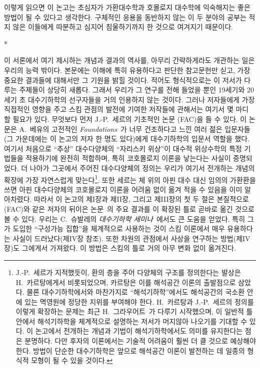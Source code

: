 이렇게 읽으면 이 논고는 초심자가 가환대수학과 호몰로지 대수학에 익숙해지는 좋은 방법이 될 수 있다고 생각한다. 구체적인 응용을 동반하지 않는 이 두 분야의 공부는 적지 않은 이들에게 따분하고 심지어 침울하기까지 한 것으로 여겨지기 때문이다.

\bigskip
\begin{center}*\quad*\quad*\end{center}
\bigskip

이 서론에서 여기 제시하는 개념과 결과의 역사를, 아무리 간략하게라도 개관하는 일은 우리의 능력 밖이다.
본문에는 이해에 특히 유용하다고 판단한 참고문헌만 싣고, 가장 중요한 결과들에 대해서만 그 기원을 밝힐 것이다.
적어도 형식적으로는 이 저서가 다루는 주제들이 상당히 새롭다. 그래서 우리가 그 연구를 전해 들었을 뿐인 19세기와 20세기 초 대수기하학의 선구자들을 거의 인용하지 않는 것이다.
그러나 저자들에게 가장 직접적인 영향을 주고 스킴 관점의 발전에 기여한 저작들에 관해서는 여기서 몇 마디 할 필요가 있다.
무엇보다 먼저 J.-P.~세르의 기초적인 논문 (FAC)을 들 수 있다. 이 논문은 A.~베유의 고전적인 \emph{Foundations}~\cite{I-18}가 너무 건조하다고 느낀 여러 젊은 입문자들(그 가운데에는 이 논고의 저자 한 명도 있다)에게 대수기하학의 입문서 역할을 했다.
여기서 처음으로 ``추상'' 대수다양체의 ``자리스키 위상''이 대수적 위상수학의 특정 기법들을 적용하기에 완전히 적합하며, 특히 코호몰로지 이론을 낳는다는 사실이 증명되었다.
더 나아가 그곳에서 주어진 대수다양체의 정의는 우리가 여기서 전개하는 개념의 확장에 가장 자연스럽게 맞는다\footnote{J.-P.~세르가 지적했듯이, 환의 층을 주어 다양체의 구조를 정의한다는 발상은 H.~카르탕에게서 비롯되었으며, 카르탕은 이를 해석공간 이론의 출발점으로 삼았다.
물론 대수기하학에서와 마찬가지로 ``해석기하학''에서도 해석공간의 국소환 안에 있는 멱영원에 정당한 지위를 부여해야 한다.
H.~카르탕과 J.-P.~세르의 정의를 이렇게 확장하는 문제는 최근 H.~그라우어트~\cite{I-5}가 다루기 시작했으며, 이 일반적 틀 안에서 해석기하학을 체계적으로 설명하는 저서가 머지않아 나오기를 기대할 수 있다.
이 논고에서 전개하는 개념과 기법이 해석기하학에서도 의미를 유지한다는 점은 분명하다. 다만 후자의 이론에서는 기술적 어려움이 훨씬 더 클 것으로 예상해야 한다.
방법이 단순한 대수기하학은 앞으로 해석공간 이론이 발전하는 데 일종의 형식적 모형이 될 수 있을 것이다.}.
또한 세르는 체 위의 아핀 대수 대신 임의의 가환환을 쓰면 아핀 대수다양체의 코호몰로지 이론을 어려움 없이 옮겨 적을 수 있음을 이미 알아차렸다.
따라서 이 논고의 제I장과 제II장, 그리고 제III장의 첫 두 절은 본질적으로 (FAC)와 같은 저자의 뒤이은 논문~\cite{I-15}의 주요 결과를 이 확장된 틀로 곧바로 옮긴 것으로 볼 수 있다.
우리는 C.~슈발레의 \emph{대수기하학 세미나}~\cite{I-1}에서도 큰 도움을 얻었다. 특히 그가 도입한 ``구성가능 집합''을 체계적으로 사용하는 것이 스킴 이론에서 매우 유용하다는 사실이 드러났다(제IV장 참조).
또한 차원의 관점에서 사상을 연구하는 방법(제IV장)도 그에게서 가져왔다. 이 방법은 스킴의 틀로 거의 아무 변화 없이 옮겨진다.

